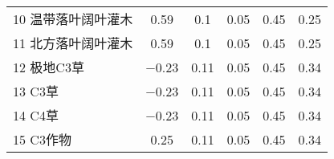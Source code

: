 \begin{table}[htbp]
\begin{tabular}{@{}lccccc@{}}
    10 温带落叶阔叶灌木 & 0.59                  & 0.1                     & 0.05                    & 0.45                    & 0.25                    \\
    11 北方落叶阔叶灌木 & 0.59                  & 0.1                     & 0.05                    & 0.45                    & 0.25                    \\
    12 极地C3草         & \num{ -0.23   }       & 0.11                    & 0.05                    & 0.45                    & 0.34                    \\
    13 C3草             & \num{ -0.23   }       & 0.11                    & 0.05                    & 0.45                    & 0.34                    \\
    14 C4草             & \num{ -0.23   }       & 0.11                    & 0.05                    & 0.45                    & 0.34                    \\
    15 C3作物           & 0.25                  & 0.11                    & 0.05                    & 0.45                    & 0.34                    \\ \bottomrule
  \end{tabular}
\end{table}



